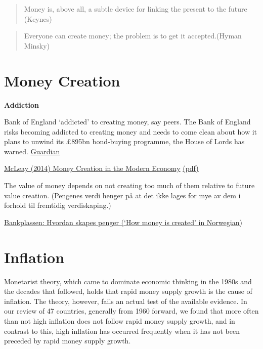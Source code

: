 \documentclass[
]{book}
\begin{document}
\begin{quote}
Money is, above all, a subtle device for linking the present to the future (Keynes)
\end{quote}

\begin{quote}
Everyone can create money; the problem is to get it accepted.(Hyman Minsky)
\end{quote}

\hypertarget{money-creation}{%
\section{Money Creation}\label{money-creation}}

\textbf{Addiction}

Bank of England `addicted' to creating money, say peers.
The Bank of England risks becoming addicted to creating money and needs to come clean about how it plans to unwind its £895bn bond-buying programme, the House of Lords has warned.
\href{https://www.theguardian.com/business/2021/jul/16/bank-of-england-creating-money-lords-quantitative-easing}{Guardian}

\href{https://www.bankofengland.co.uk/-/media/boe/files/quarterly-bulletin/2014/money-creation-in-the-modern-economy.pdf}{McLeay (2014) Money Creation in the Modern Economy}
\href{pdf/money-creation-in-the-modern-economy.pdf}{(pdf)}

The value of money depends on not creating too much of them relative to future value creation.
(Pengenes verdi henger på at det ikke lages for mye av dem i forhold til fremtidig verdiskaping.)

\href{https://bankplassen.norges-bank.no/2019/01/04/hvordan-skapes-penger/}{Bankplassen: Hvordan skapes penger (`How money is created' in Norwegian)}

\hypertarget{inflation}{%
\section{Inflation}\label{inflation}}

Monetarist theory, which came to dominate economic thinking in the 1980s and the decades that followed, holds that rapid money supply growth is the cause of inflation. The theory, however, fails an actual test of the available evidence. In our review of 47 countries, generally from 1960 forward, we found that more often than not high inflation does not follow rapid money supply growth, and in contrast to this, high inflation has occurred frequently when it has not been preceded by rapid money supply growth.
\end{document}
